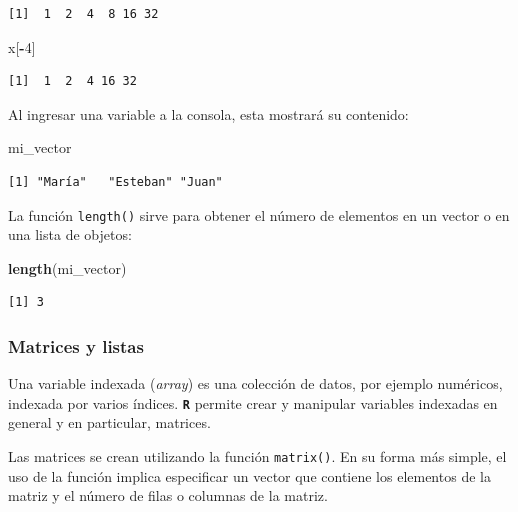 \documentclass[
]{article}
\newenvironment{Shaded}{\begin{snugshade}}{\end{snugshade}}
\newcommand{\DecValTok}[1]{\textcolor[rgb]{0.00,0.00,0.81}{#1}}
\newcommand{\FunctionTok}[1]{\textcolor[rgb]{0.13,0.29,0.53}{\textbf{#1}}}
\newcommand{\NormalTok}[1]{#1}
\newcommand{\SpecialCharTok}[1]{\textcolor[rgb]{0.81,0.36,0.00}{\textbf{#1}}}
\begin{document}
\begin{verbatim}
[1]  1  2  4  8 16 32
\end{verbatim}

\begin{Shaded}
\begin{Highlighting}[]
\NormalTok{x[}\SpecialCharTok{{-}}\DecValTok{4}\NormalTok{]}
\end{Highlighting}
\end{Shaded}

\begin{verbatim}
[1]  1  2  4 16 32
\end{verbatim}

Al ingresar una variable a la consola, esta mostrará su contenido:

\begin{Shaded}
\begin{Highlighting}[]
\NormalTok{mi\_vector}
\end{Highlighting}
\end{Shaded}

\begin{verbatim}
[1] "María"   "Esteban" "Juan"   
\end{verbatim}

La función \texttt{length()} sirve para obtener el número de elementos en un vector o en una lista de objetos:

\begin{Shaded}
\begin{Highlighting}[]
\FunctionTok{length}\NormalTok{(mi\_vector)}
\end{Highlighting}
\end{Shaded}

\begin{verbatim}
[1] 3
\end{verbatim}

\hypertarget{matrices-y-listas}{%
\subsubsection{Matrices y listas}\label{matrices-y-listas}}

Una variable indexada (\emph{array}) es una colección de datos, por ejemplo numéricos, indexada por varios índices. \textbf{\texttt{R}} permite crear y manipular variables indexadas en general y en particular, matrices.

Las matrices se crean utilizando la función \texttt{matrix()}. En su forma más simple, el uso de la función implica especificar un vector que contiene los elementos de la matriz y el número de filas o columnas de la matriz.
\end{document}
